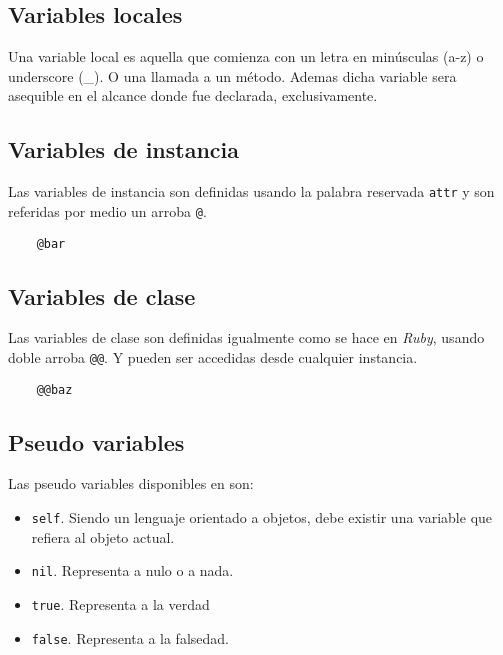 \documentclass[12pt,letterpaper,titlepage,oneside,openright]{book}
\newcommand{\OhTeX}{%
    \makebox[0.76em][c]{O}%
    \makebox[0.25em][c]{%
        \raisebox{0.14em}[0em][0em]{%
            \fontsize{0.5em}{0cm}%
                \selectfont H%
        }%
    }%
    \makebox[1.35em][c]{\TeX}%
}
\newcommand{\ohtex}{\OhTeX\xspace}
\newcommand{\ruby}{\textit{Ruby}\xspace}
\begin{document}
\subsection{Variables locales}

Una variable local es aquella que comienza con un letra en minúsculas (a-z) o
underscore (\_). O una llamada a un método. Ademas dicha variable sera asequible
en el alcance donde fue declarada, exclusivamente.

\subsection{Variables de instancia}

Las variables de instancia son definidas usando la palabra reservada \texttt{attr} y son referidas por medio un arroba \texttt{@}.

\begin{center}
\begin{minipage}{\linewidth}
\begin{lstlisting}
    @bar
\end{lstlisting}
\end{minipage}
\end{center}

\subsection{Variables de clase}

Las variables de clase son definidas igualmente como se hace en \ruby, usando doble arroba \texttt{@@}. Y pueden ser accedidas desde cualquier instancia.

\begin{center}
\begin{minipage}{\linewidth}
\begin{lstlisting}
    @@baz
\end{lstlisting}
\end{minipage}
\end{center}

\subsection{Pseudo variables}

Las pseudo variables disponibles en \ohtex son:

\begin{itemize}
    \item \texttt{self}. Siendo un lenguaje orientado a objetos, debe existir una variable que refiera al objeto actual.
    \item \texttt{nil}. Representa a nulo o a nada.
    \item \texttt{true}. Representa a la verdad
    \item \texttt{false}. Representa a la falsedad.
\end{itemize}
\end{document}
